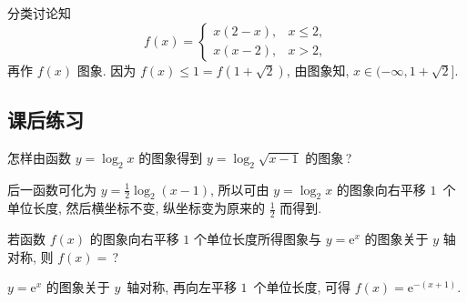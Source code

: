   \beginsolution
    分类讨论知
    \[f(x)=\begin{cases}
      x(2-x),& x\leqslant 2,\\
      x(x-2),& x>2,
      \end{cases}\]
    再作 $f(x)$ 图象. 因为 $f(x)\leqslant 1=f(1+\sqrt2)$, 由图象知, $x\in(-\infty,1+\sqrt2]$.
  \endsolution
  
  \subsection{课后练习}
  \begin{exercise}
    怎样由函数 $y=\log_2 x$ 的图象得到 $y=\log_2 \sqrt{x-1}$ 的图象\,?
  \end{exercise}

  \beginsolution
    后一函数可化为 $y=\frac12\log_2 (x-1)$, 所以可由 $y=\log_2 x$ 的图象向右平移 $1$~个单位长度, 然后横坐标不变, 纵坐标变为原来的 $\frac12$ 而得到.
  \endsolution
  
  \begin{exercise}
    若函数 $f(x)$ 的图象向右平移 $1$ 个单位长度所得图象与 
    $y=\mathrm{e}^x$ 的图象关于 $y$ 轴对称, 则 $f(x)=$\,?
  \end{exercise}

  \beginsolution
    $y=\mathrm{e}^x$ 的图象关于 $y$~轴对称, 再向左平移 $1$~个单位长度, 可得 $f(x)=\mathrm{e}^{-(x+1)}$.
  \endsolution
  
